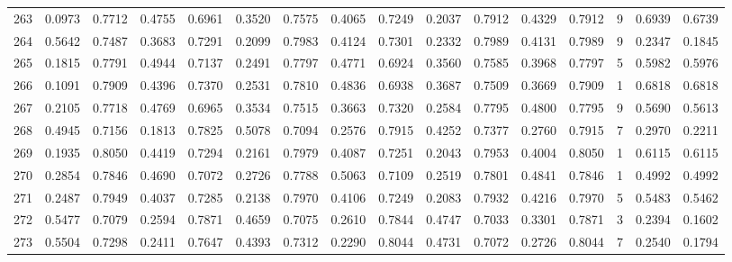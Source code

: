 \begin{tabular}{lrrrrrrrrrrrrrrr}
263 &      0.0973 &  0.7712 &  0.4755 &  0.6961 &  0.3520 &  0.7575 &  0.4065 &  0.7249 &  0.2037 &  0.7912 &   0.4329 &     0.7912 &      9 &                    0.6939 &                     0.6739 \\
264 &      0.5642 &  0.7487 &  0.3683 &  0.7291 &  0.2099 &  0.7983 &  0.4124 &  0.7301 &  0.2332 &  0.7989 &   0.4131 &     0.7989 &      9 &                    0.2347 &                     0.1845 \\
265 &      0.1815 &  0.7791 &  0.4944 &  0.7137 &  0.2491 &  0.7797 &  0.4771 &  0.6924 &  0.3560 &  0.7585 &   0.3968 &     0.7797 &      5 &                    0.5982 &                     0.5976 \\
266 &      0.1091 &  0.7909 &  0.4396 &  0.7370 &  0.2531 &  0.7810 &  0.4836 &  0.6938 &  0.3687 &  0.7509 &   0.3669 &     0.7909 &      1 &                    0.6818 &                     0.6818 \\
267 &      0.2105 &  0.7718 &  0.4769 &  0.6965 &  0.3534 &  0.7515 &  0.3663 &  0.7320 &  0.2584 &  0.7795 &   0.4800 &     0.7795 &      9 &                    0.5690 &                     0.5613 \\
268 &      0.4945 &  0.7156 &  0.1813 &  0.7825 &  0.5078 &  0.7094 &  0.2576 &  0.7915 &  0.4252 &  0.7377 &   0.2760 &     0.7915 &      7 &                    0.2970 &                     0.2211 \\
269 &      0.1935 &  0.8050 &  0.4419 &  0.7294 &  0.2161 &  0.7979 &  0.4087 &  0.7251 &  0.2043 &  0.7953 &   0.4004 &     0.8050 &      1 &                    0.6115 &                     0.6115 \\
270 &      0.2854 &  0.7846 &  0.4690 &  0.7072 &  0.2726 &  0.7788 &  0.5063 &  0.7109 &  0.2519 &  0.7801 &   0.4841 &     0.7846 &      1 &                    0.4992 &                     0.4992 \\
271 &      0.2487 &  0.7949 &  0.4037 &  0.7285 &  0.2138 &  0.7970 &  0.4106 &  0.7249 &  0.2083 &  0.7932 &   0.4216 &     0.7970 &      5 &                    0.5483 &                     0.5462 \\
272 &      0.5477 &  0.7079 &  0.2594 &  0.7871 &  0.4659 &  0.7075 &  0.2610 &  0.7844 &  0.4747 &  0.7033 &   0.3301 &     0.7871 &      3 &                    0.2394 &                     0.1602 \\
273 &      0.5504 &  0.7298 &  0.2411 &  0.7647 &  0.4393 &  0.7312 &  0.2290 &  0.8044 &  0.4731 &  0.7072 &   0.2726 &     0.8044 &      7 &                    0.2540 &                     0.1794 \\

\end{tabular}
